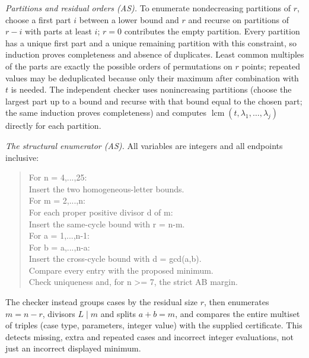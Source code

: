 \documentclass[11pt,a4paper]{article}
\numberwithin{equation}{section}
\theoremstyle{definition}
\theoremstyle{remark}
\newcommand{\lcm}{\operatorname{lcm}}
\begin{document}
\emph{Partitions and residual orders (AS).} To enumerate nondecreasing
partitions of $r$, choose a first part $i$ between a lower bound and $r$ and
recurse on partitions of $r-i$ with parts at least $i$; $r=0$ contributes the
empty partition. Every partition has a unique first part and a unique
remaining partition with this constraint, so induction proves completeness and
absence of duplicates. Least common multiples of the parts are exactly the
possible orders of permutations on $r$ points; repeated values may be
deduplicated because only their maximum after combination with $t$ is needed.
The independent checker uses nonincreasing partitions (choose the largest part
up to a bound and recurse with that bound equal to the chosen part; the same
induction proves completeness) and computes $\lcm(t,\lambda_1,\ldots,\lambda_j)$
directly for each partition.

\emph{The structural enumerator (AS).} All variables are integers and all
endpoints inclusive:
\begin{quote}\small\ttfamily
For n = 4,...,25:\\
\hspace*{1em}Insert the two homogeneous-letter bounds.\\
\hspace*{1em}For m = 2,...,n:\\
\hspace*{2em}For each proper positive divisor d of m:\\
\hspace*{3em}Insert the same-cycle bound with r = n-m.\\
\hspace*{1em}For a = 1,...,n-1:\\
\hspace*{2em}For b = a,...,n-a:\\
\hspace*{3em}Insert the cross-cycle bound with d = gcd(a,b).\\
\hspace*{1em}Compare every entry with the proposed minimum.\\
\hspace*{1em}Check uniqueness and, for n >= 7, the strict AB margin.
\end{quote}
The checker instead groups cases by the residual size $r$, then enumerates
$m=n-r$, divisors $L\mid m$ and splits $a+b=m$, and compares the entire
multiset of triples (case type, parameters, integer value) with the supplied
certificate. This detects missing, extra and repeated cases and incorrect
integer evaluations, not just an incorrect displayed minimum.
\end{document}
